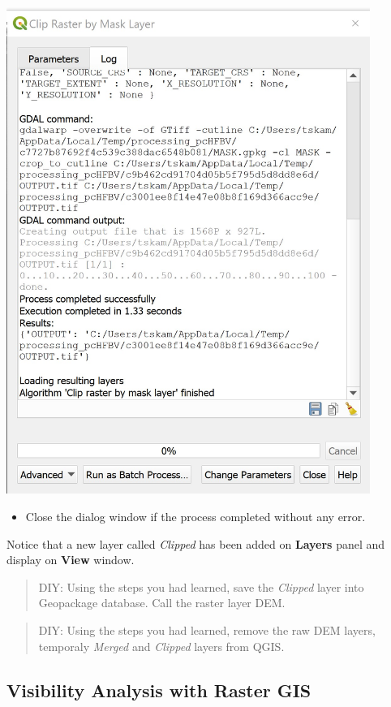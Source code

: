 \documentclass[
  letterpaper,
  DIV=11,
  numbers=noendperiod]{scrreprt}
\providecommand{\tightlist}{%
  \setlength{\itemsep}{0pt}\setlength{\parskip}{0pt}}\usepackage{longtable,booktabs,array}
\begin{document}
\includegraphics[width=4.66667in,height=\textheight]{./img06/image52.jpg}

\begin{itemize}
\tightlist
\item
  Close the dialog window if the process completed without any error.
\end{itemize}

Notice that a new layer called \emph{Clipped} has been added on
\textbf{Layers} panel and display on \textbf{View} window.

\begin{quote}
DIY: Using the steps you had learned, save the \emph{Clipped} layer into
Geopackage database. Call the raster layer DEM.
\end{quote}

\begin{quote}
DIY: Using the steps you had learned, remove the raw DEM layers,
temporaly \emph{Merged} and \emph{Clipped} layers from QGIS.
\end{quote}

\hypertarget{visibility-analysis-with-raster-gis}{%
\subsection{Visibility Analysis with Raster
GIS}\label{visibility-analysis-with-raster-gis}}
\end{document}
